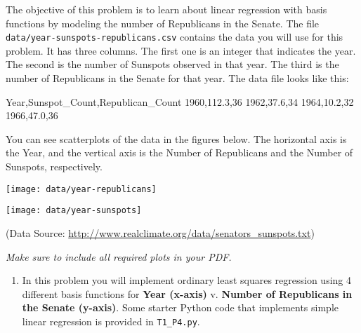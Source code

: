 \documentclass[submit]{harvardml}
\begin{document}
\begin{problem}
  
 The objective of this problem is to learn about linear regression
 with basis functions by modeling the number of Republicans in the
 Senate. The file \verb|data/year-sunspots-republicans.csv| contains the
 data you will use for this problem.  It has three columns.  The first
 one is an integer that indicates the year.  The second is the number
 of Sunspots observed in that year.  The third is the number of Republicans in the Senate for that year.
 The data file looks like this:
 \begin{csv}
Year,Sunspot_Count,Republican_Count
1960,112.3,36
1962,37.6,34
1964,10.2,32
1966,47.0,36
\end{csv}

You can see scatterplots of the data in the figures below.  The horizontal axis is the Year, and the vertical axis is the Number of Republicans and the Number of Sunspots, respectively.

\begin{center}
\texttt{[image: data/year-republicans]}
\end{center}

\begin{center}
\texttt{[image: data/year-sunspots]}
\end{center}

(Data Source: \url{http://www.realclimate.org/data/senators_sunspots.txt})\\
\vspace{-5mm}


\vspace{0.5cm}
\noindent\emph{Make sure to include all required plots in your PDF.}

\begin{enumerate}

\item In this problem you will implement ordinary least squares regression using 4 different basis functions for
\textbf{Year (x-axis)} v. \textbf{Number of Republicans in the Senate (y-axis)}. Some starter Python code
that implements simple linear regression is provided in \verb|T1_P4.py|.


\end{enumerate}
\end{problem}
\end{document}
